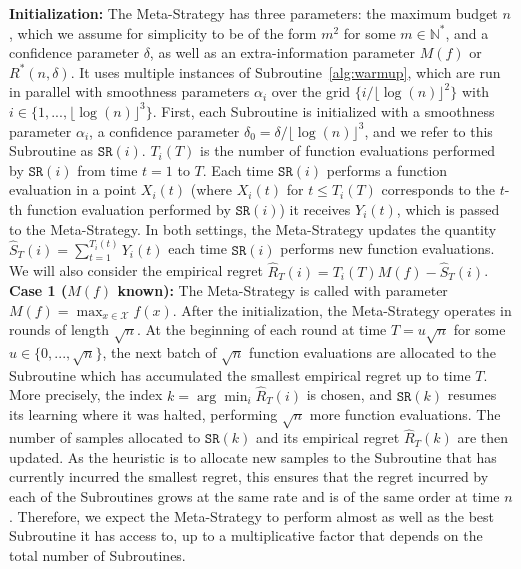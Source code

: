 \documentclass[final,12pt]{colt2018}
\newcommand{\floor}[1]{\lfloor #1 \rfloor}
\begin{document}
\noindent\textbf{Initialization:} The Meta-Strategy has three parameters: the maximum budget $n$, which we assume for simplicity to be of the form $m^2$ for some $m \in \mathbb N^*$, and a confidence parameter $\delta$, as well as an extra-information parameter $M(f)$ or $R^*(n,\delta)$. It uses multiple instances of Subroutine~\ref{alg:warmup}, which are run in parallel with smoothness parameters $\alpha_i$ over the grid $\{i/\floor{\log(n)}^2\}$ with ${i \in \{1,..., \floor{\log(n)}^3\}}$. First, each Subroutine is initialized with a smoothness parameter $\alpha_i$, a confidence parameter $\delta_0 = \delta/\floor{\log(n)}^3$, and we refer to this Subroutine as $\texttt{SR}(i)$. $T_i(T)$ is the number of function evaluations performed by $\texttt{SR}(i)$ from time $t = 1$ to $T$. Each time $\texttt{SR}(i)$ performs a function evaluation in a point $X_i(t)$ (where $X_i(t)$ for $t \leq T_i(T)$ corresponds to the $t$-th function evaluation performed by $\texttt{SR}(i)$) it receives $Y_i(t)$, which is passed to the Meta-Strategy. In both settings, the Meta-Strategy updates the quantity $\widehat{S}_T(i) = \sum_{t=1}^{T_i(t)} Y_i(t)$ each time $\texttt{SR}(i)$ performs new function evaluations. We will also consider the empirical regret $\widehat{R}_T(i) = T_i(T)M(f) - \widehat{S}_T(i)$.\\

\noindent\textbf{Case 1 ($M(f)$ known):} The Meta-Strategy is called with parameter $M(f) = \max_{x \in \mathcal X} f(x)$. After the initialization, the Meta-Strategy operates in rounds of length $\sqrt{n}$. At the beginning of each round at time $T = u \sqrt{n}$ for some $u \in \{0, ..., \sqrt{n}\}$, the next batch of $\sqrt{n}$ function evaluations are allocated to the Subroutine which has accumulated the smallest empirical regret up to time $T$. More precisely, the index $k = \arg\min_i \widehat{R}_T(i)$ is chosen, and $\texttt{SR}(k)$ resumes its learning where it was halted, performing $\sqrt{n}$ more function evaluations. The number of samples allocated to $\texttt{SR}(k)$ and its empirical regret $\widehat{R}_T(k)$ are then updated. As the heuristic is to allocate new samples to the Subroutine that has currently incurred the smallest regret, this ensures that the regret incurred by each of the Subroutines grows at the same rate and is of the same order at time $n$. Therefore, we expect the Meta-Strategy to perform almost as well as the best Subroutine it has access to, up to a multiplicative factor that depends on the total number of Subroutines.\\
\end{document}
